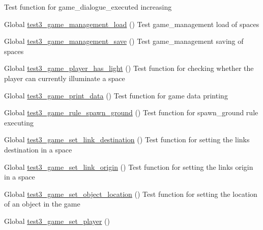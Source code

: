 \begin{DoxyRefList}
%
Test function for game\+\_\+dialogue\+\_\+executed increasing  
\item[Global \mbox{\hyperlink{game__management__test_8c_a8cfc366148d4c0b286ae95775d185d4d}{test3\+\_\+game\+\_\+management\+\_\+load}} ()]\label{test__test000111}%
%
Test game\+\_\+management load of spaces  
\item[Global \mbox{\hyperlink{game__management__test_8c_a3262bfa9613cd59cd3125e3207990b0e}{test3\+\_\+game\+\_\+management\+\_\+save}} ()]\label{test__test000125}%
%
Test game\+\_\+management saving of spaces  
\item[Global \mbox{\hyperlink{game__test_8c_a34e804f61b1434be0cb7681126c9a1f1}{test3\+\_\+game\+\_\+player\+\_\+has\+\_\+light}} ()]\label{test__test000172}%
%
Test function for checking whether the player can currently illuminate a space  
\item[Global \mbox{\hyperlink{game__test_8c_a3edf290393995e164084f0e0f7724e77}{test3\+\_\+game\+\_\+print\+\_\+data}} ()]\label{test__test000150}%
%
Test function for game data printing  
\item[Global \mbox{\hyperlink{game__test_8c_a4c68c0204e093daedd865d1b19b5e349}{test3\+\_\+game\+\_\+rule\+\_\+spawn\+\_\+ground}} ()]\label{test__test000413}%
%
Test function for spawn\+\_\+ground rule executing  
\item[Global \mbox{\hyperlink{game__test_8c_a3efe139d33095ea988889ae97f6b4152}{test3\+\_\+game\+\_\+set\+\_\+link\+\_\+destination}} ()]\label{test__test000251}%
%
Test function for setting the link\textquotesingle{}s destination in a space  
\item[Global \mbox{\hyperlink{game__test_8c_aa82749334160fdb98aa97d9f0c4c2db3}{test3\+\_\+game\+\_\+set\+\_\+link\+\_\+origin}} ()]\label{test__test000245}%
%
Test function for setting the link\textquotesingle{}s origin in a space  
\item[Global \mbox{\hyperlink{game__test_8c_a2eb1b65a3a2adf0a890377debabbf265}{test3\+\_\+game\+\_\+set\+\_\+object\+\_\+location}} ()]\label{test__test000208}%
%
Test function for setting the location of an object in the game  
\item[Global \mbox{\hyperlink{game__test_8c_ada38e1dcc95d9a1253bc10d6171d65b8}{test3\+\_\+game\+\_\+set\+\_\+player}} ()]\label{test__test000155}%

\end{DoxyRefList}
